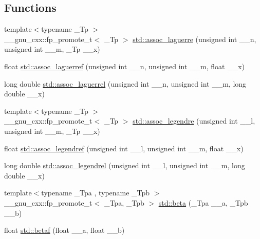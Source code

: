 \subsection*{Functions}
\begin{DoxyCompactItemize}
\item 
{\footnotesize template$<$typename \+\_\+\+Tp $>$ }\\\+\_\+\+\_\+gnu\+\_\+cxx\+::fp\+\_\+promote\+\_\+t$<$ \+\_\+\+Tp $>$ \hyperlink{group__tr29124__math__spec__func_ga0b33e0ac3066f2353861ce2f34b43f57}{std\+::assoc\+\_\+laguerre} (unsigned int \+\_\+\+\_\+n, unsigned int \+\_\+\+\_\+m, \+\_\+\+Tp \+\_\+\+\_\+x)
\item 
float \hyperlink{group__tr29124__math__spec__func_gaf83d98f350a1cfcebee6a1f723cf90d2}{std\+::assoc\+\_\+laguerref} (unsigned int \+\_\+\+\_\+n, unsigned int \+\_\+\+\_\+m, float \+\_\+\+\_\+x)
\item 
long double \hyperlink{group__tr29124__math__spec__func_gac8e245671fb2df5de5fd978d03081f6c}{std\+::assoc\+\_\+laguerrel} (unsigned int \+\_\+\+\_\+n, unsigned int \+\_\+\+\_\+m, long double \+\_\+\+\_\+x)
\item 
{\footnotesize template$<$typename \+\_\+\+Tp $>$ }\\\+\_\+\+\_\+gnu\+\_\+cxx\+::fp\+\_\+promote\+\_\+t$<$ \+\_\+\+Tp $>$ \hyperlink{group__tr29124__math__spec__func_ga7aa4182446f687094b12688078517d53}{std\+::assoc\+\_\+legendre} (unsigned int \+\_\+\+\_\+l, unsigned int \+\_\+\+\_\+m, \+\_\+\+Tp \+\_\+\+\_\+x)
\item 
float \hyperlink{group__tr29124__math__spec__func_ga3ced07ddd24bf4af56e2712d148e7f57}{std\+::assoc\+\_\+legendref} (unsigned int \+\_\+\+\_\+l, unsigned int \+\_\+\+\_\+m, float \+\_\+\+\_\+x)
\item 
long double \hyperlink{group__tr29124__math__spec__func_ga55977b425a539146f060dec1c8003344}{std\+::assoc\+\_\+legendrel} (unsigned int \+\_\+\+\_\+l, unsigned int \+\_\+\+\_\+m, long double \+\_\+\+\_\+x)
\item 
{\footnotesize template$<$typename \+\_\+\+Tpa , typename \+\_\+\+Tpb $>$ }\\\+\_\+\+\_\+gnu\+\_\+cxx\+::fp\+\_\+promote\+\_\+t$<$ \+\_\+\+Tpa, \+\_\+\+Tpb $>$ \hyperlink{group__tr29124__math__spec__func_gacd36403ae64b89840b1504f97024dcee}{std\+::beta} (\+\_\+\+Tpa \+\_\+\+\_\+a, \+\_\+\+Tpb \+\_\+\+\_\+b)
\item 
float \hyperlink{group__tr29124__math__spec__func_ga12dc61ee4c09172151cf092ed387e203}{std\+::betaf} (float \+\_\+\+\_\+a, float \+\_\+\+\_\+b)

\end{DoxyCompactItemize}
